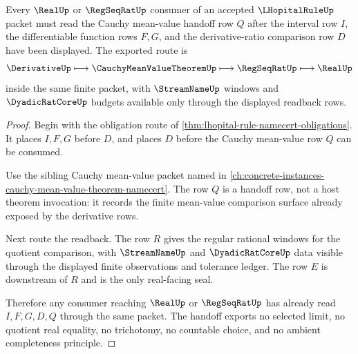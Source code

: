 \begin{theorem}
\label{thm:lhopital-rule-cauchy-mean-value-handoff}
Every $\RealUp$ or $\RegSeqRatUp$ consumer of an accepted $\LHopitalRuleUp$ packet must read the Cauchy mean-value handoff row $Q$ after the interval row $I$, the differentiable function rows $F,G$, and the derivative-ratio comparison row $D$ have been displayed. The exported route is
$$
\DerivativeUp \longmapsto \CauchyMeanValueTheoremUp \longmapsto \RegSeqRatUp \longmapsto \RealUp
$$
inside the same finite packet, with $\StreamNameUp$ windows and $\DyadicRatCoreUp$ budgets available only through the displayed readback rows.
\end{theorem}
\begin{proof}
Begin with the obligation route of \autoref{thm:lhopital-rule-namecert-obligations}. It places $I,F,G$ before $D$, and places $D$ before the Cauchy mean-value row $Q$ can be consumed.

Use the sibling Cauchy mean-value packet named in \autoref{ch:concrete-instances-cauchy-mean-value-theorem-namecert}. The row $Q$ is a handoff row, not a host theorem invocation: it records the finite mean-value comparison surface already exposed by the derivative rows.

Next route the readback. The row $R$ gives the regular rational windows for the quotient comparison, with $\StreamNameUp$ and $\DyadicRatCoreUp$ data visible through the displayed finite observations and tolerance ledger. The row $E$ is downstream of $R$ and is the only real-facing seal.

Therefore any consumer reaching $\RealUp$ or $\RegSeqRatUp$ has already read $I,F,G,D,Q$ through the same packet. The handoff exports no selected limit, no quotient real equality, no trichotomy, no countable choice, and no ambient completeness principle.
\end{proof}



